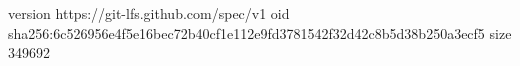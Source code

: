version https://git-lfs.github.com/spec/v1
oid sha256:6c526956e4f5e16bec72b40cf1e112e9fd3781542f32d42c8b5d38b250a3ecf5
size 349692
